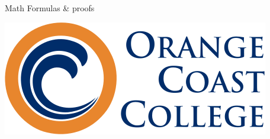 \documentclass{article}%
\begin{document}
\begin{center} %
    {\Huge Math Formulas \& proofs} %

\end{center} %
\begin{center}
\end{center}


\vspace{10mm} %

\begin{center} %
    \includegraphics[width=0.3\linewidth]{figures/OCC_Logo.png} %
\end{center} %
\end{document}
